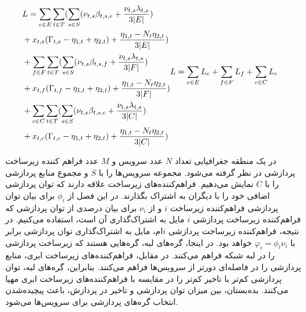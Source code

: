 	\begin{subequations}
		\begin{align}
		& \notag L = \sum_{e \in E}\sum_{t \in T}(\sum_{s \in S}(\nu_{t,s}\beta_{t,s,e}+\frac{\nu_{t,s}\lambda_{t,s}}{3|E|}) \\
		&\notag + x_{t,e}(\Gamma_{t,e}-\eta_{1,t}+\eta_{2,t})+\frac{\eta_{1,t}-N_t\eta_{2,t}}{3|E|}) \\
		& \notag + \sum_{f \in F}\sum_{t \in T}(\sum_{s \in S}(\nu_{t,s}\beta_{t,s,f}+\frac{\nu_{t,s}\lambda_{t,s}}{3|F|}) \\
		& \notag + x_{t,f}(\Gamma_{t,f}-\eta_{1,t}+\eta_{2,t})+\frac{\eta_{1,t}-N_t\eta_{2,t}}{3|F|}) \\
		& \notag + \sum_{c \in C}\sum_{t \in T}(\sum_{s \in S}(\nu_{t,s}\beta_{t,s,c}+\frac{\nu_{t,s}\lambda_{t,s}}{3|C|}) \\
		&+ x_{t,c}(\Gamma_{t,c}-\eta_{1,t}+\eta_{2,t})+\frac{\eta_{1,t}-N_t\eta_{2,t}}{3|C|})
		\end{align}
		\begin{align}
		& L = \sum_{e \in E}L_e + \sum_{f \in F}L_f + \sum_{c \in C}L_c
		\end{align}
	\end{subequations}
    
    
    

    در یک منطقه جغرافیایی تعداد $N$ عدد سرویس و $M$ عدد فراهم کننده زیرساخت پردازشی در نظر گرفته می‌شود.
    مجموعه سرویس‌ها را با $S$ و مجموع منابع پردازشی را با $C$ نمایش می‌دهیم.
    فراهم‌کننده‌های زیرساخت علاقه دارند که توان پردازشی اضافی خود را با دیگران به اشتراک بگذارند.
    در این فصل از $\phi_i$ برای بیان توان پردازشی فراهم‌کننده زیرساخت $i$ و از $\nu_i$ برای بیان درصدی از توان پردازشی که فراهم‌کننده زیرساخت پردازشی $i$ مایل به اشتراک‌گذاری آن است، استفاده می‌کنیم.
    در نتیجه، فراهم‌کننده زیرساخت پردازشی $i$ام، مایل به اشتراک‌گذاری توان پردازشی برابر با $\varphi_i = \phi_i \nu_i$ خواهد بود.
    در اینجا، گره‌های لبه، گره‌هایی هستند که زیرساخت پردازشی را در لبه شبکه فراهم می‌کنند.
    در مقابل، فراهم‌کننده‌های زیرساخت ابری، منابع پردازشی را در فاصله‌ای دورتر از سرویس‌ها فراهم می‌کنند.
    بنابراین،‌ گره‌های لبه، توان پردازشی کم‌تر با تاخیر کم‌تر را در مقایسه با فراهم‌کننده‌های زیرساخت ابری مهیا می‌کنند.
    بده‌بستان، بین میزان توان پردازشی و تاخیر در پردازش، باعث پیچیده‌شدن انتخاب گره‌های پردازشی برای سرویس‌ها می‌شود.
    
